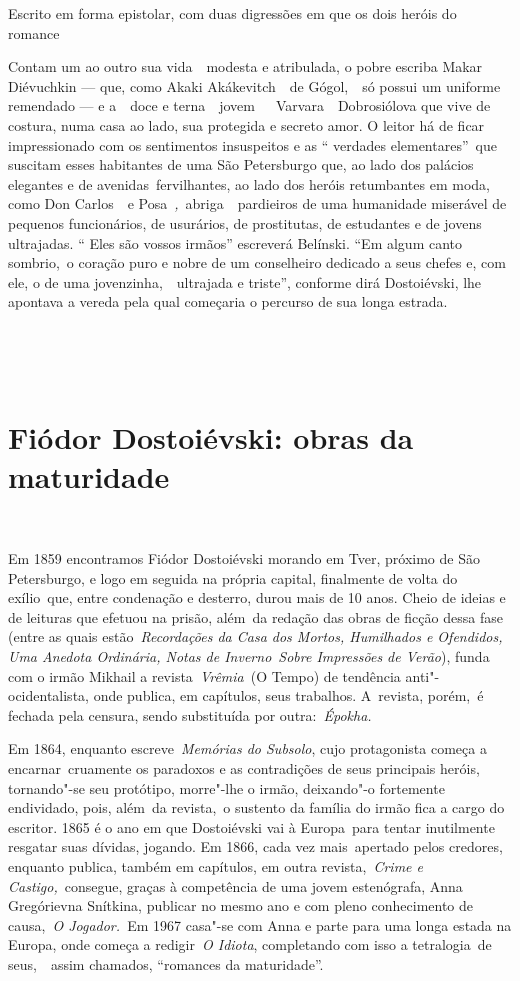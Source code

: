 Escrito em forma epistolar, com duas digressões em que os dois heróis do
romance

Contam um ao outro sua vida~~modesta e atribulada, o pobre escriba Makar
Diévuchkin --- que, como Akaki Akákevitch~~de Gógol,~~só possui um
uniforme remendado --- e a~~doce e terna~~jovem~~~Varvara~~Dobrosiólova
que vive de costura, numa casa ao lado, sua protegida e secreto amor. O
leitor há de ficar impressionado com os sentimentos insuspeitos e as ``
verdades elementares''~que suscitam esses habitantes de uma São
Petersburgo que, ao lado dos palácios elegantes e de
avenidas~fervilhantes, ao lado dos heróis retumbantes em moda, como Don
Carlos~~e Posa~\emph{,}~abriga~~pardieiros de uma humanidade miserável
de pequenos funcionários, de usurários, de prostitutas, de estudantes e
de jovens ultrajadas. `` Eles são vossos irmãos'' escreverá Belínski.
``Em algum canto sombrio,~o coração puro e nobre de um conselheiro
dedicado a seus chefes e, com ele, o de uma jovenzinha,~~ultrajada e
triste'', conforme dirá Dostoiévski, lhe apontava a vereda pela qual
começaria o percurso de sua longa estrada.

~

~

\section{Fiódor Dostoiévski: obras da maturidade}

~

Em 1859 encontramos Fiódor Dostoiévski morando em Tver, próximo de São
Petersburgo, e logo em seguida na própria capital, finalmente de volta
do exílio~que, entre condenação e desterro, durou mais de 10 anos. Cheio
de ideias e de leituras que efetuou na prisão, além~da redação das obras
de ficção dessa fase (entre as quais estão~\emph{Recordações da Casa dos
Mortos, Humilhados e Ofendidos, Uma Anedota Ordinária, Notas de
Inverno}~\emph{Sobre Impressões de Verão}), funda com o irmão Mikhail a
revista~\emph{Vrêmia}~(O Tempo) de tendência anti"-ocidentalista, onde
publica, em capítulos, seus trabalhos. A~revista, porém,~é fechada pela
censura, sendo substituída por outra:~\emph{Épokha.}

Em 1864, enquanto escreve~\emph{Memórias do Subsolo}, cujo protagonista
começa a encarnar~cruamente os paradoxos e as contradições de seus
principais heróis, tornando"-se seu protótipo, morre"-lhe o irmão,
deixando"-o fortemente endividado, pois, além~da revista,~o sustento da
família do irmão fica a cargo do escritor. 1865 é o ano em que
Dostoiévski vai à Europa~para tentar inutilmente resgatar suas dívidas,
jogando. Em 1866, cada vez mais~apertado pelos credores, enquanto
publica, também em capítulos, em outra revista,~\emph{Crime e
Castigo,}~consegue, graças à competência de uma jovem estenógrafa, Anna
Gregórievna Snítkina, publicar no mesmo ano e com pleno conhecimento de
causa,~\emph{O Jogador.~}Em 1967 casa"-se com Anna e parte para uma longa
estada na Europa, onde começa a redigir~\emph{O Idiota}, completando com
isso a tetralogia~de seus,~~assim chamados, ``romances da maturidade''.


